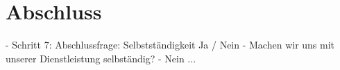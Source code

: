 \section{Abschluss}

	- Schritt 7: Abschlussfrage: Selbstständigkeit Ja / Nein
	- Machen wir uns mit unserer Dienstleistung selbständig?
		- Nein ...